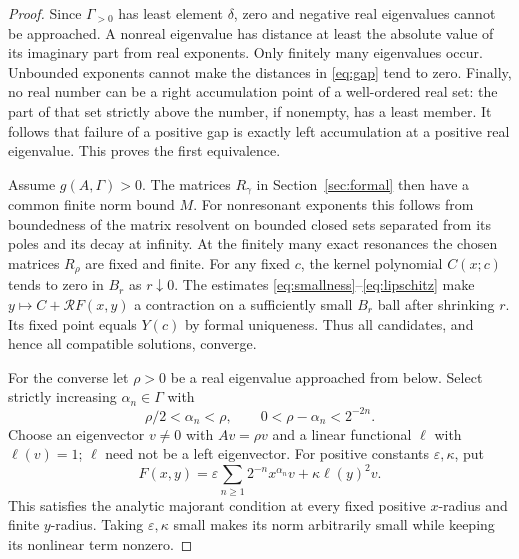 \documentclass[11pt,a4paper]{article}
\numberwithin{equation}{section}
\theoremstyle{definition}
\theoremstyle{remark}
\newcommand{\G}{\Gamma}
\begin{document}
\begin{proof}
Since $\G_{>0}$ has least element $\delta$, zero and negative real
eigenvalues cannot be approached. A nonreal eigenvalue has distance at
least the absolute value of its imaginary part from real exponents.
Only finitely many eigenvalues occur. Unbounded exponents cannot make
the distances in \eqref{eq:gap} tend to zero. Finally, no real number can
be a right accumulation point of a well-ordered real set: the part of
that set strictly above the number, if nonempty, has a least member.
It follows that failure of a positive gap is exactly left accumulation
at a positive real eigenvalue. This proves the first equivalence.

Assume $g(A,\G)>0$. The matrices $R_\gamma$ in
Section~\ref{sec:formal} then have a common finite norm bound $M$.
For nonresonant exponents this follows from boundedness of the matrix
resolvent on bounded closed sets separated from its poles and its decay
at infinity. At the finitely many exact resonances the chosen matrices
$R_\rho$ are fixed and finite. For any fixed $c$, the kernel polynomial
$C(x;c)$ tends to zero in $B_r$ as $r\downarrow0$.
The estimates \eqref{eq:smallness}--\eqref{eq:lipschitz} make
$y\mapsto C+\mathscr R F(x,y)$ a contraction on a sufficiently small
$B_r$ ball after shrinking $r$. Its fixed point equals $Y(c)$ by formal
uniqueness. Thus all candidates, and hence all compatible solutions,
converge.

For the converse let $\rho>0$ be a real eigenvalue approached from below.
Select strictly increasing $\alpha_n\in\G$ with
\begin{equation}\label{eq:bad-sequence}
 \rho/2<\alpha_n<\rho,
 \qquad 0<\rho-\alpha_n<2^{-2n}.
\end{equation}
Choose an eigenvector $v\ne0$ with $Av=\rho v$ and a linear functional
$\ell$ with $\ell(v)=1$; $\ell$ need not be a left eigenvector.
For positive constants $\varepsilon,\kappa$, put
\begin{equation}\label{eq:quadratic-bad}
 F(x,y)=\varepsilon\sum_{n\geq1}2^{-n}x^{\alpha_n}v
           +\kappa\ell(y)^2v.
\end{equation}
This satisfies the analytic majorant condition at every fixed positive
$x$-radius and finite $y$-radius. Taking $\varepsilon,\kappa$ small makes
its norm arbitrarily small while keeping its nonlinear term nonzero.


\end{proof}
\end{document}
